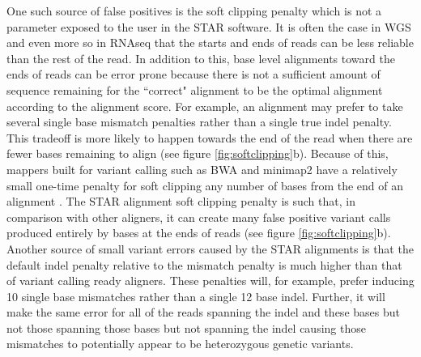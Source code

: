 \par{
One such source of false positives is the 
soft clipping penalty which is not a parameter exposed to the user in the STAR software. It is often the case in WGS and even more so in RNAseq that the starts and ends of
reads can be less reliable than the rest of the read. In addition to this, base level alignments toward the ends of reads can be error prone because there is not a sufficient amount of sequence remaining for the ``correct" alignment to be the optimal alignment according to the alignment score. For example, an alignment may prefer to take several single base mismatch penalties rather than a single true indel penalty. This tradeoff is more likely to happen towards the end of the read when there are fewer bases remaining to align (see figure \ref{fig:softclipping}b). Because of this, mappers built for variant calling such as BWA \cite{bwa} and minimap2 \cite{minimap2} have 
a relatively small one-time penalty for soft clipping any number of bases from the end of an alignment \cite{variantartifacts}. The STAR alignment soft clipping penalty is such that, in 
comparison with other aligners, it can create many false positive variant calls produced entirely by bases at the ends of reads (see figure \ref{fig:softclipping}b). Another source of 
small variant errors caused by the STAR alignments is that the default indel penalty relative to the mismatch penalty is much higher than that of 
variant calling ready aligners. These penalties will, for example, prefer inducing 10 single base mismatches rather than a single 12 base indel. Further, it will make the same error for all of the reads spanning the indel and these bases but not those spanning those bases but not spanning the indel causing those mismatches to potentially appear to be heterozygous genetic variants. 
}


